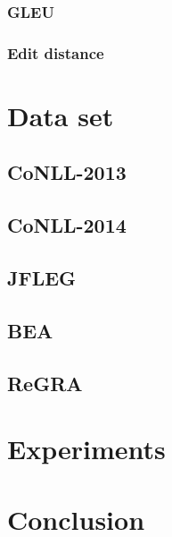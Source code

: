 \documentclass{article}
\begin{document}
\subsubsection{GLEU}

\subsubsection{Edit distance}

\section{Data set}

\subsection{CoNLL-2013}

\subsection{CoNLL-2014}

\subsection{JFLEG}

\subsection{BEA}

\subsection{ReGRA}


\section{Experiments}

\section{Conclusion}
\end{document}
